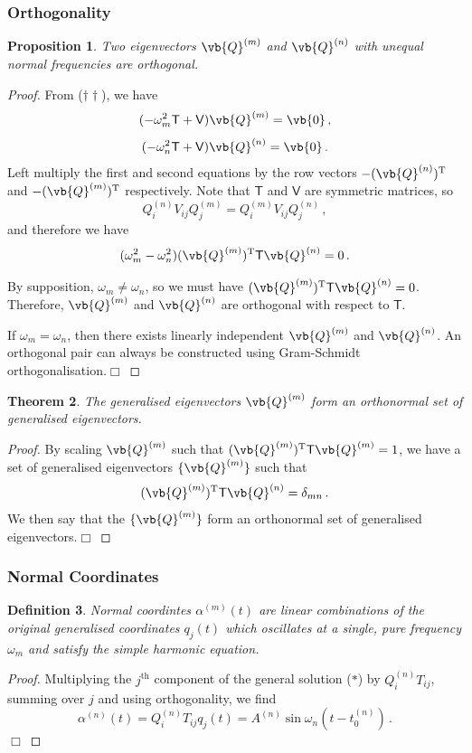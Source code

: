 \documentclass{article}
\theoremstyle{plain}\theoremheaderfont{\normalfont\itshape}\theorembodyfont{\rmfamily}\theoremseparator{.}\newtheorem*{rem}{Remark}\newtheorem*{ex}{Example}\newtheorem*{proof}{Proof}\newtheorem*{altp}{Alternative proof}
\theoremstyle{plain}\theoremheaderfont{\normalfont\bfseries}\theorembodyfont{\rmfamily}\theoremseparator{.}\newtheorem{thm}{Theorem}[section]\newtheorem{lem}[thm]{Lemma}\newtheorem{prop}[thm]{Proposition}\newtheorem*{cor}{Corollary}\newtheorem{defn}[thm]{Definition}\newtheorem{clm}[thm]{Claim}\newtheorem{clminproof}{Claim}
\theoremstyle{break}\theoremheaderfont{\normalfont\itshape}\theorembodyfont{\rmfamily}\theoremseparator{.\medskip}\newtheorem*{proofskip}{Proof}\newtheorem*{exs}{Examples}\newtheorem*{rems}{Remarks}
\theoremstyle{break}\theoremheaderfont{\normalfont\bfseries}\theorembodyfont{\rmfamily}\theoremseparator{.\medskip}\newtheorem{lemskip}[thm]{Lemma}\newtheorem{defnskip}[thm]{Definition}\newtheorem{propskip}[thm]{Proposition}\newtheorem{thmskip}[thm]{Theorem}
\numberwithin{equation}{section}
\newcommand{\qed}{\hfill\ensuremath{\Box}}
\newcommand{\tp}{^\mathrm{T}}
\begin{document}
	\subsubsection{Orthogonality}
	\begin{prop}
		Two eigenvectors \(\vb{Q}^{(m)}\) and \(\vb{Q}^{(n)}\) with unequal normal frequencies are orthogonal.
	\end{prop}
	\begin{proof}
		From (\(\dagger\dagger\)), we have
		\[(-\omega_m^2\mathsf{T}+\mathsf{V})\vb{Q}^{(m)}=\vb{0}\,,\]
		\[(-\omega_n^2\mathsf{T}+\mathsf{V})\vb{Q}^{(n)}=\vb{0}\,.\]
		Left multiply the first and second equations by the row vectors \(-(\vb{Q}^{(n)})\tp\) and \(-(\vb{Q}^{(m)})\tp\) respectively. Note that \(\mathsf{T}\) and \(\mathsf{V}\) are symmetric matrices, so
		\[Q_i^{(n)}V_{ij}Q_j^{(m)}=Q_i^{(m)}V_{ij}Q_j^{(n)}\,,\]
		and therefore we have
		\[(\omega_m^2-\omega_n^2)(\vb{Q}^{(m)})\tp\mathsf{T}\vb{Q}^{(n)}=0\,.\]

		By supposition, \(\omega_m\ne\omega_n\), so we must have \((\vb{Q}^{(m)})\tp\mathsf{T}\vb{Q}^{(n)}=0\). Therefore, \(\vb{Q}^{(m)}\) and \(\vb{Q}^{(n)}\) are orthogonal with respect to \(\mathsf{T}\).

		If \(\omega_m=\omega_n\), then there exists linearly independent \(\vb{Q}^{(m)}\) and \(\vb{Q}^{(n)}\). An orthogonal pair can always be constructed using Gram-Schmidt orthogonalisation.\qed
	\end{proof}

	\begin{thm}
		The generalised eigenvectors \(\vb{Q}^{(m)}\) form an orthonormal set of generalised eigenvectors.
	\end{thm}
	\begin{proof}
		By scaling \(\vb{Q}^{(m)}\) such that \((\vb{Q}^{(m)})\tp\mathsf{T}\vb{Q}^{(m)}=1\), we have a set of generalised eigenvectors \(\{\vb{Q}^{(m)}\}\) such that
		\[(\vb{Q}^{(m)})\tp\mathsf{T}\vb{Q}^{(n)}=\delta_{mn}\,.\]
		We then say that the \(\{\vb{Q}^{(m)}\}\) form an orthonormal set of generalised eigenvectors.\qed
	\end{proof}
	\subsubsection{Normal Coordinates}
	\begin{defn}
		\textit{Normal coordintes} \(\alpha^{(m)}(t)\) are linear combinations of the original generalised coordinates \(q_j(t)\) which oscillates at a single, pure frequency \(\omega_m\) and satisfy the simple harmonic equation.
	\end{defn}
	\begin{prop}\label[prop]{normco}
		The normal coordinates are given by
		\[\alpha^{(n)}(t)=Q_{i}^{(n)}T_{ij}q_j(t)\,.\]
	\end{prop}
	\begin{proof}
		Multiplying the \(j^\text{th}\) component of the general solution (\(*\)) by \(Q_{i}^{(n)}T_{ij}\), summing over \(j\) and using orthogonality, we find
		\[\alpha^{(n)}(t)=Q_{i}^{(n)}T_{ij}q_j(t)=A^{(n)}\sin\omega_n(t-t_0^{(n)})\,.\]\qed
	\end{proof}
\end{document}
